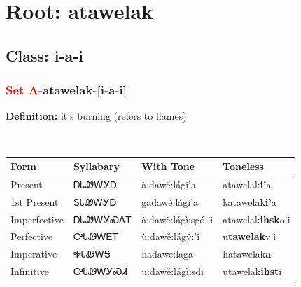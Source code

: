 \needspace{4in}
\section*{Root: atawelak}
\nopagebreak
{}
\needspace{3in}
\subsection*{Class: i-a-i}
\nopagebreak
\needspace{2in}
\subsubsection*{\textcolor{Red}{Set A}{-}\textbf{atawelak}{-}[i-a-i]}
\nopagebreak
\textbf{Definition: } it{\textquoteright}s burning (refers to flames)
\\[0.5em]
\begin{tabularx}{\textwidth}{l X X X}%
\toprule%
\textbf{Form}&\textbf{Syllabary}&\textbf{With Tone}&\textbf{Toneless}\\%
\midrule%
Present&ᎠᏓᏪᎳᎩᎠ&à:dawě:lági’a&atawelak\textbf{i'}a\\%
1st Present&ᎦᏓᏪᎳᎩᎠ&gadawě:lági’a&katawelak\textbf{i'}a\\%
Imperfective&ᎠᏓᏪᎳᎩᏍᎪᎢ&à:dawě:lágì:sgó:’i&atawelak\textbf{ihsk}o'i\\%
Perfective&ᎤᏓᏪᎳᎬᎢ&ù:dawě:lágv̌:’i&u\textbf{tawelak}v'i\\%
Imperative&ᎭᏓᏪᎳᎦ&hadawe:laga&hatawelak\textbf{a}\\%
Infinitive&ᎤᏓᏪᎳᎩᏍᏗ&u:dawě:lágì:sdi&utawelak\textbf{ihst}i\\%
\bottomrule%
\end{tabularx}
\\[1em]